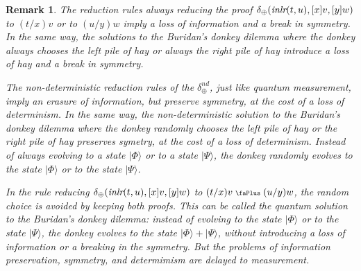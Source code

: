 \documentclass[screen, sigconf,authorversion,nonacm]{acmart}
\theoremstyle{acmdefinition}
\newtheorem{remark}[theorem]{Remark}}
\numberwithin{equation}{section}
\newcommand\ket[1]{\ensuremath{|{#1}\rangle}}
\newcommand\abstr[1]{[#1]}
\newcommand\inlr{\mbox{\it inlr}}
\newcommand\plus{\mathrel{\text{\normalfont\scalebox{0.7}{\faPlus}}}}
\newcommand\elimplus{\delta_{\oplus}}
\begin{document}
\begin{remark}
The reduction rules always reducing the proof \linebreak
$\elimplus(\inlr(t,u),\abstr{x}v,\abstr{y}w)$ to $(t/x)v$ or to
$(u/y)w$ imply a loss of information and a break in symmetry.  In the
same way, the solutions to the Buridan's donkey dilemma where the
donkey always chooses the left pile of hay or always the right pile of
hay introduce a loss of hay and a break in symmetry.

The non-deterministic reduction rules of the $\elimplus^{nd}$, just
like quantum measurement, imply an erasure of information, but
preserve symmetry, at the cost of a loss of determinism.  In the same
way, {\it the non-deterministic solution to the Buridan's donkey
dilemma} where the donkey randomly chooses the left pile of hay or
the right pile of hay preserves symetry, at the cost of a loss of
determinism.  
Instead of always evolving to a state $\ket{\Phi}$ or to a state $\ket{\Psi}$, the donkey randomly evolves to the state $\ket{\Phi}$ or to the state $\ket{\Psi}$.

In the rule reducing $\elimplus(\inlr(t,u),\abstr{x}v,\abstr{y}w)$ to
$(t/x)v \plus (u/y)w$, the random choice is avoided by keeping both
proofs.  This can be called {\it the quantum solution to the Buridan's
  donkey dilemma}: instead of evolving to the state
$\ket{\Phi}$ or to the state $\ket{\Psi}$, the donkey
evolves to the state $\ket{\Phi} + \ket{\Psi}$, without introducing a
loss of information or a breaking in the symmetry.  But the problems
of information preservation, symmetry, and determimism are delayed to
measurement.
\end{remark}
\end{document}
